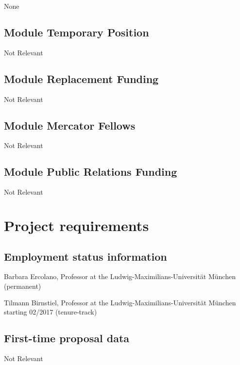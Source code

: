 \documentclass[10pt,fleqn,twoside]{article}
\newcommand{\Tcol}{\color{blue}}
\begin{document}
None 

\subsection{\Tcol Module Temporary Position}

Not Relevant 

\subsection{\Tcol Module Replacement Funding}

Not Relevant 

\subsection{\Tcol Module Mercator Fellows}

Not Relevant 

\subsection{\Tcol Module Public Relations Funding}

Not Relevant 

\section{\Tcol Project requirements}
\renewcommand{\leftmark}{\sc Project requirements}

\subsection{\Tcol Employment status information}

Barbara Ercolano, Professor at the Ludwig-Maximilians-Universit\"at
M\"unchen  (permanent)

Tilmann Birnstiel, Professor at the Ludwig-Maximilians-Universit\"at M\"unchen starting 02/2017  (tenure-track)

\subsection{\Tcol First-time proposal data}

Not Relevant
\end{document}
